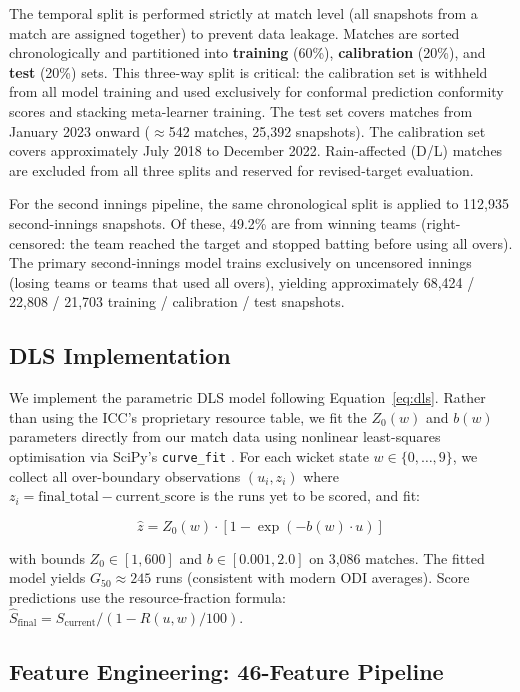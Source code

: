 \documentclass[10pt,a4paper,twocolumn]{article}
\begin{document}
The temporal split is performed strictly at match level (all snapshots from a match are assigned together) to prevent data leakage. Matches are sorted chronologically and partitioned into \textbf{training} (60\%), \textbf{calibration} (20\%), and \textbf{test} (20\%) sets. This three-way split is critical: the calibration set is withheld from all model training and used exclusively for conformal prediction conformity scores and stacking meta-learner training. The test set covers matches from January 2023 onward ($\approx$542 matches, 25,392 snapshots). The calibration set covers approximately July 2018 to December 2022. Rain-affected (D/L) matches are excluded from all three splits and reserved for revised-target evaluation.

For the second innings pipeline, the same chronological split is applied to 112,935 second-innings snapshots. Of these, 49.2\% are from winning teams (right-censored: the team reached the target and stopped batting before using all overs). The primary second-innings model trains exclusively on uncensored innings (losing teams or teams that used all overs), yielding approximately 68,424 / 22,808 / 21,703 training / calibration / test snapshots.

\subsection{DLS Implementation}

We implement the parametric DLS model following Equation~\ref{eq:dls}. Rather than using the ICC's proprietary resource table, we fit the $Z_0(w)$ and $b(w)$ parameters directly from our match data using nonlinear least-squares optimisation via SciPy's \texttt{curve\_fit} \citep{scipy}. For each wicket state $w \in \{0, \ldots, 9\}$, we collect all over-boundary observations $(u_i, z_i)$ where $z_i = \text{final\_total} - \text{current\_score}$ is the runs yet to be scored, and fit:

\begin{equation}
\hat{z} = Z_0(w) \cdot \left[1 - \exp\left(-b(w) \cdot u\right)\right]
\end{equation}

\noindent with bounds $Z_0 \in [1, 600]$ and $b \in [0.001, 2.0]$ on 3,086 matches. The fitted model yields $G_{50} \approx 245$ runs (consistent with modern ODI averages). Score predictions use the resource-fraction formula: $\hat{S}_\text{final} = S_\text{current} / (1 - R(u,w)/100)$.

\subsection{Feature Engineering: 46-Feature Pipeline}
\label{sec:features}
\end{document}
